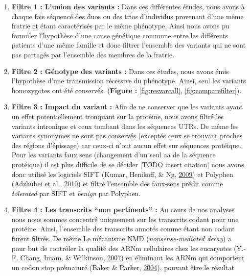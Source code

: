 \documentclass[12pt,twoside]{reedthesis}
\providecommand{\tightlist}{%
  \setlength{\itemsep}{0pt}\setlength{\parskip}{0pt}}
\theoremstyle{definition}
\theoremstyle{definition}
\theoremstyle{remark}
\begin{document}
  \begin{enumerate}
  \def\labelenumi{\arabic{enumi}.}
  \tightlist
  \item
    \textbf{Filtre 1 : L'union des variants :} Dans ces différentes
    études, nous avons à chaque fois séquencé des duos ou des trios
    d'individus provenant d'une même fratrie et étant caractérisés par le
    même phénotype. Ainsi nous avons pu formuler l'hypothèse d'une cause
    génétique commune entre les différents patients d'une même famille et
    donc filtrer l'ensemble des variants qui ne sont pas partagés par
    l'ensemble des membres de la fratrie.\\
  \item
    \textbf{Filtre 2 : Génotype des variants :} Dans ces études, nous
    avons émis l'hypothèse d'une transmission récessive du phénotype.
    Ainsi, seul les variants homozygotes ont été conservés.
    (\textbf{Figure : }\ref{fig:resvarcall}, \ref{fig:comparefilter}).\\
  \item
    \textbf{Filtre 3 : Impact du variant :} Afin de ne conserver que les
    variants ayant un effet potentiellement tronquant sur la protéine,
    nous avons filtré les variants intronique et ceux tombant dans les
    séquences UTRs. De même les variants synonymes ne sont pas conservés
    (exceptés ceux se trouvant proches des régions d'épissage) car ceux-ci
    n'ont aucun effet sur séquences protéique. Pour les variants faux sens
    (changement d'un seul aa de la séquence protéique) il est plus
    difficile de se décider {[}TODO insert citation{]} nous avons donc
    utilisé les logiciels SIFT (Kumar, Henikoff, \& Ng,
    \protect\hyperlink{ref-Kumar2009}{2009}) et Polyphen (Adzhubei et al.,
    \protect\hyperlink{ref-Adzhubei2010}{2010}) et filtré l'ensemble des
    faux-sens prédit comme \emph{tolerated} par SIFT et \emph{benign} par
    Polyphen.\\
  \item
    \textbf{Filtre 4 : Les transcrits ``non pertinents'' :} Au cours de
    nos analyses nous nous sommes concentré uniquement sur les transcrits
    codant pour une protéine. Ainsi, l'ensemble des transcrits annotés
    comme étant non codant furent filtrés. De même Le mécanisme NMD
    (\emph{nonsense-mediated decay}) a pour but de contrôler la qualité
    des ARNm cellulaires chez les eucaryotes (Y.-F. Chang, Imam, \&
    Wilkinson, \protect\hyperlink{ref-Chang2007}{2007}) en éliminant les
    ARNm qui comportent un codon stop prématuré (Baker \& Parker,
    \protect\hyperlink{ref-Baker2004}{2004}), pouvant être le résultat

\end{enumerate}
\end{document}
